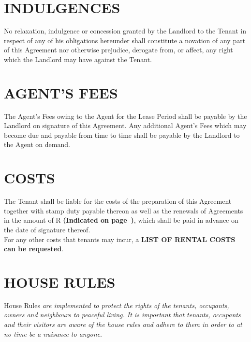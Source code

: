 \documentclass[11pt]{article}
\begin{document}
\section{\uppercase{indulgences}}

No relaxation, indulgence or concession granted by the Landlord to the Tenant in respect of any of his obligations hereunder shall constitute a novation of any part of this Agreement nor otherwise prejudice, derogate from, or affect, any right which the Landlord may have against the Tenant.

\section{\uppercase{agent's fees}}
\label{sec:agent-fees}

The Agent's Fees owing to the Agent for the Lease Period shall be payable by the Landlord on signature of this Agreement. Any additional Agent's Fees which may become due and payable from time to time shall be payable by the Landlord to the Agent on demand.

\section{\uppercase{costs}}
\label{sec:costs}

The Tenant shall be liable for the costs of the preparation of this Agreement together with stamp duty payable thereon as well as the renewals of Agreements in the amount of R\underline{\hspace{6em}} \textbf{(Indicated on page~\pageref{input:admin-preparation-fees})}, which shall be paid in advance on the date of signature thereof. \\

For any other costs that tenants may incur, a \textbf{LIST OF RENTAL COSTS can be requested}.

\section{\uppercase{house rules}}
\label{sec:house-rules}

House Rules \textit{are implemented to protect the rights of the tenants, occupants, owners and neighbours to peaceful living. It is important that tenants, occupants and their visitors are aware of the house rules and adhere to them in order to at no time be a nuisance to anyone}.
\end{document}
